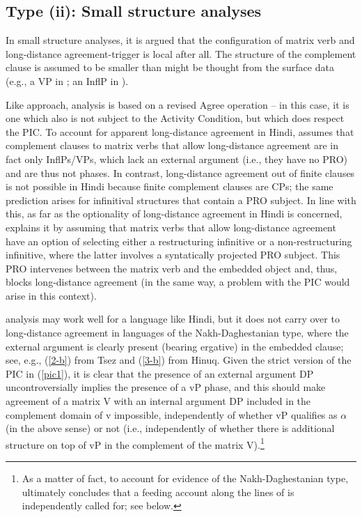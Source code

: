 \documentclass[output=paper
,modfonts
,nonflat]{langsci/langscibook}
\begin{document}
	\subsection{Type (ii): Small structure analyses}
	
	In small structure analyses, it is argued that the configuration of matrix verb
	and long-distance agree\-ment-trigger is local after all. The structure
	of the complement clause is assumed to be smaller than might be
	thought from the surface data (e.g., a VP in \citealt{Boeckx:04}; an
	InflP in \citealt{Bhatt:05}).
	
	Like  approach,  analysis is
	based on a revised Agree operation -- in this case, it is one which also is not
	subject to the Activity Condition, but which does respect the PIC.
	To account for apparent long-distance agreement in Hindi, \citet{Bhatt:05} assumes
	that complement clauses to  matrix verbs that allow long-distance agreement are in fact
	only InflPs/VPs, which lack an external argument (i.e., they have
	no PRO) and are thus not phases. In contrast, long-distance
	agreement out of finite clauses is not possible in Hindi because
	finite complement clauses are CPs; the same prediction arises
	for infinitival structures that contain a PRO subject. 
	In line with this, as far as the optionality of long-distance agreement in Hindi is
	concerned, 
	\citet{Bhatt:05} explains it by
	assuming that matrix verbs that allow long-distance agreement have an option of selecting
	either a restructuring infinitive or a non-restructuring infinitive, where the latter involves a syntatically projected PRO subject.
	This PRO intervenes between the matrix verb and the embedded
	object and, thus, blocks long-distance agreement (in the same way,
	a problem with the PIC would arise in this context). 
	
	 analysis may work well for a language like Hindi,
	but it does not carry over to long-distance agreement in languages of
	the Nakh-Daghestanian type, where the external argument is clearly
	present (bearing ergative) in the embedded clause; see, e.g.,
	(\ref{2-b}) from Tsez and (\ref{3-b}) from Hinuq. Given the strict version
	of the PIC in (\ref{pic1}), it is clear that the presence of an external
	argument DP uncontroversially implies the presence of a vP phase, and
	this should make agreement of a matrix V with an internal argument DP
	included in the complement domain of v impossible, independently of
	whether vP qualifies as $\alpha$ (in the above sense) or not (i.e.,
	independently of whether there is additional structure on top of vP in
	the complement of the matrix V).\footnote{As a matter of fact, to
		account for evidence of the Nakh-Daghestanian type, 
		\citet[791]{Bhatt:05} ultimately concludes that a feeding account along the lines of \cite{PolinskyPotsdam:01}  is independently called
		for; see below.}
	
\end{document}
